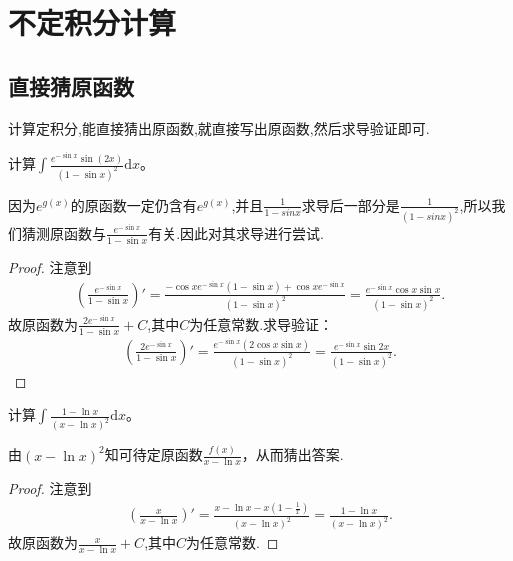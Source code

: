 \documentclass[../../main.tex]{subfiles}
\begin{document}
\section{不定积分计算}

\subsection{直接猜原函数}

计算定积分,能直接猜出原函数,就直接写出原函数,然后求导验证即可.

\vspace{0.5cm}

\begin{example}
计算\(\int \frac{e^{-\sin x}\sin(2x)}{(1 - \sin x)^2}\mathrm{d}x\)。
\end{example}
\begin{note}
因为$e^{g(x)}$的原函数一定仍含有$e^{g(x)}$,并且$\frac{1}{1-sinx}$求导后一部分是$\frac{1}{(1-sinx)^2}$,所以我们猜测原函数与$\frac{e^{-\sin x}}{1-\sin x}$有关.因此对其求导进行尝试.
\end{note}
\begin{proof}
注意到
\begin{align*}
\left(\frac{e^{-\sin x}}{1 - \sin x}\right)' = \frac{-\cos x e^{-\sin x}(1 - \sin x)+\cos x e^{-\sin x}}{(1 - \sin x)^2}
=\frac{e^{-\sin x}\cos x\sin x}{(1 - \sin x)^2}.
\end{align*}
故原函数为\(\frac{2e^{-\sin x}}{1 - \sin x}+C\),其中$C$为任意常数.求导验证：
\begin{align*}
\left(\frac{2e^{-\sin x}}{1 - \sin x}\right)'=\frac{e^{-\sin x}(2\cos x\sin x)}{(1 - \sin x)^2}=\frac{e^{-\sin x}\sin 2x}{(1 - \sin x)^2}.
\end{align*} 
\end{proof}

\begin{example}
计算\(\int \frac{1 - \ln x}{(x - \ln x)^2}\mathrm{d}x\)。
\end{example}
\begin{note}
由\((x - \ln x)^2\)知可待定原函数\(\frac{f(x)}{x - \ln x}\)，从而猜出答案.
\end{note}
\begin{proof}
注意到
\begin{align*}
\left( \frac{x}{x-\ln x} \right) \prime =\frac{x-\ln x-x\left( 1-\frac{1}{x} \right)}{\left( x-\ln x \right) ^2}=\frac{1-\ln x}{\left( x-\ln x \right) ^2}.
\end{align*}
故原函数为$\frac{x}{x-\ln x}+C$,其中$C$为任意常数.
\end{proof}
\end{document}
